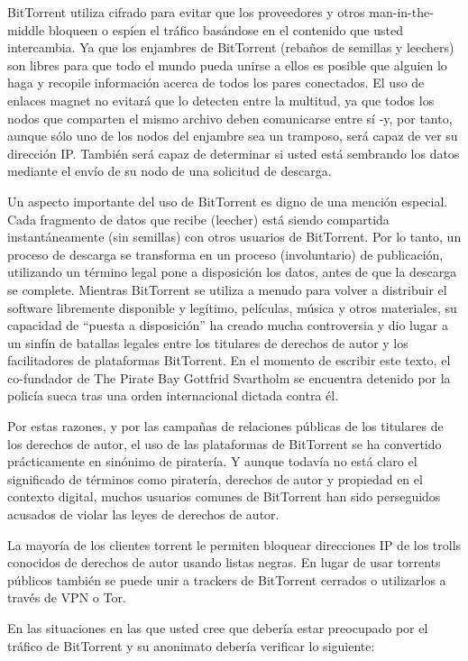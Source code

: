 \documentclass[10pt,a5paper,twoside,,]{book}
\begin{document}
BitTorrent utiliza cifrado para evitar que los proveedores y otros
man-in-the-middle bloqueen o espíen el tráfico basándose en el contenido
que usted intercambia. Ya que los enjambres de BitTorrent (rebaños de
semillas y leechers) son libres para que todo el mundo pueda unirse a
ellos es posible que alguien lo haga y recopile información acerca de
todos los pares conectados. El uso de enlaces magnet no evitará que lo
detecten entre la multitud, ya que todos los nodos que comparten el
mismo archivo deben comunicarse entre sí -y, por tanto, aunque sólo uno
de los nodos del enjambre sea un tramposo, será capaz de ver su
dirección IP. También será capaz de determinar si usted está sembrando
los datos mediante el envío de su nodo de una solicitud de descarga.

Un aspecto importante del uso de BitTorrent es digno de una mención
especial. Cada fragmento de datos que recibe (leecher) está siendo
compartida instantáneamente (sin semillas) con otros usuarios de
BitTorrent. Por lo tanto, un proceso de descarga se transforma en un
proceso (involuntario) de publicación, utilizando un término legal pone
a disposición los datos, antes de que la descarga se complete. Mientras
BitTorrent se utiliza a menudo para volver a distribuir el software
libremente disponible y legítimo, películas, música y otros materiales,
su capacidad de ``puesta a disposición'' ha creado mucha controversia y
dio lugar a un sinfín de batallas legales entre los titulares de
derechos de autor y los facilitadores de plataformas BitTorrent. En el
momento de escribir este texto, el co-fundador de The Pirate Bay
Gottfrid Svartholm se encuentra detenido por la policía sueca tras una
orden internacional dictada contra él.

Por estas razones, y por las campañas de relaciones públicas de los
titulares de los derechos de autor, el uso de las plataformas de
BitTorrent se ha convertido prácticamente en sinónimo de piratería. Y
aunque todavía no está claro el significado de términos como piratería,
derechos de autor y propiedad en el contexto digital, muchos usuarios
comunes de BitTorrent han sido perseguidos acusados de violar las leyes
de derechos de autor.

La mayoría de los clientes torrent le permiten bloquear direcciones IP
de los trolls conocidos de derechos de autor usando listas negras. En
lugar de usar torrents públicos también se puede unir a trackers de
BitTorrent cerrados o utilizarlos a través de VPN o Tor.

En las situaciones en las que usted cree que debería estar preocupado
por el tráfico de BitTorrent y su anonimato debería verificar lo
siguiente:
\end{document}
